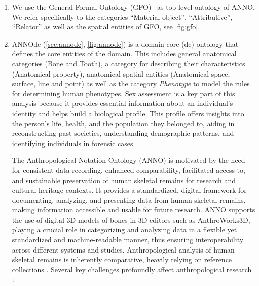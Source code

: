 \documentclass[sw]{iosart2x}
\begin{document}
\begin{enumerate}
\item We use the General Formal Ontology (GFO)~\citep{gfo} as top-level ontology of ANNO.
We refer specifically to the categories \enquote{Material object}, \enquote{Attributive}, \enquote{Relator} as well as the spatial entities of GFO, see \cref{fig:gfo}. %

\item ANNOdc (\cref{sec:annodc}, \cref{fig:annodc}) is a domain-core (dc) ontology that defines the core entities of the domain.
This includes general anatomical categories (Bone and Tooth), a category for describing their characteristics (Anatomical property), anatomical spatial entities (Anatomical space, surface, line and point) as well as the category \emph{Phenotype} to model the rules for determining human phenotypes.
Sex assessment is a key part of this analysis because it provides essential information about an individual's identity and helps build a biological profile.
This profile offers insights into the person's life, health, and the population they belonged to, aiding in reconstructing past societies, understanding demographic patterns, and identifying individuals in forensic cases.

The Anthropological Notation Ontology (ANNO) is motivated by the need for consistent data recording, enhanced comparability, facilitated access to, and sustainable preservation of human skeletal remains for research and cultural heritage contexts.
It provides a standardized, digital framework for documenting, analyzing, and presenting data from human skeletal remains, making information accessible and usable for future research.
ANNO supports the use of digital 3D models of bones in 3D editors such as AnthroWorks3D, playing a crucial role in categorizing and analyzing data in a flexible yet standardized and machine-readable manner, thus ensuring interoperability across different systems and studies.
Anthropological analysis of human skeletal remains is inherently comparative, heavily relying on reference collections \citep{spurensuche}.
Several key challenges profoundly affect anthropological research \citep{aw3dcidoc}:


\end{enumerate}
\end{document}
